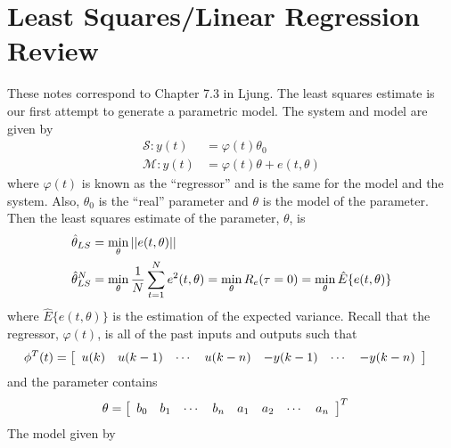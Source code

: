 \mainmatter%
\setcounter{page}{1}

\lectureseries[\course]{\course}

\date{October 20, 2009}

\setaddress%

\setcounter{lecture}{7}
\setcounter{chapter}{7}


\section{Least Squares/Linear Regression Review}
These notes correspond to Chapter 7.3 in Ljung.
The least squares estimate is our first attempt to generate a parametric model.
The system and model are given by
\begin{align*}
\mathcal{S}: y(t) &= \varphi(t)\theta_0 \\
\mathcal{M}: y(t) &= \varphi(t)\theta + e(t,\theta)
\end{align*}
where $\varphi(t)$ is known as the ``regressor'' and is the same for the model and the system.
Also, $\theta_0$ is the ``real'' parameter and $\theta$ is the model of the parameter.
Then the least squares estimate of the parameter, $\theta$, is
\begin{align*}
\hat{\theta}_{LS} &= \min_\theta ||e(t,\theta)|| \\
\hat{\theta}_{LS}^N &= \min_\theta \frac{1}{N}\sum_{t=1}^N e^2(t,\theta) = \min_\theta R_e(\tau=0) = \min_\theta\hat{E}\{e(t,\theta)\}
\end{align*}
where $\hat{E}\{e(t,\theta)\}$ is the estimation of the expected variance.
Recall that the regressor, $\varphi(t)$, is all of the past inputs and outputs such that
\begin{align}
\label{eq:regressor}
\phi^T(t) &= \left[\begin{array}{c c c c c c c}
u(k) & u(k-1) & \cdots & u(k-n) & -y(k-1) & \cdots & -y(k-n) \end{array}\right]
\end{align}
and the parameter contains
\begin{align}
\label{eq:parameter}
\theta &= \left[\begin{array}{c c c c c c c c}
b_0 & b_1 & \cdots & b_n & a_1 & a_2 & \cdots & a_n \end{array}\right]^T
\end{align}
The model given by

